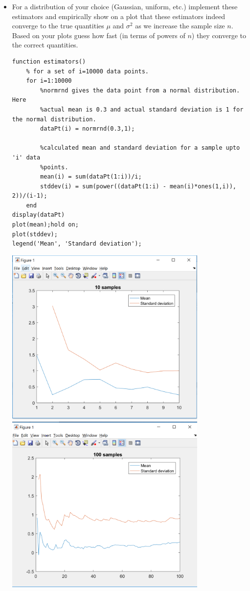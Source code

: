 \documentclass{article}
\begin{document}
\begin{itemize}
\item For a distribution of your choice (Gaussian, uniform, etc.) implement these estimators and empirically show on a plot that these estimators indeed converge to the true quantities $\mu$ and $\sigma^2$ as we increase the sample size $n$. Based on your plots guess how fast (in terms of powers of $n$) they converge to the correct quantities.\\
\begin{verbatim}
function estimators()
    % for a set of i=10000 data points.
    for i=1:10000
        %normrnd gives the data point from a normal distribution. Here
        %actual mean is 0.3 and actual standard deviation is 1 for the normal distribution.
        dataPt(i) = normrnd(0.3,1); 
        
        %calculated mean and standard deviation for a sample upto 'i' data
        %points.
        mean(i) = sum(dataPt(1:i))/i; 
        stddev(i) = sum(power((dataPt(1:i) - mean(i)*ones(1,i)), 2))/(i-1); 
    end
display(dataPt)
plot(mean);hold on;
plot(stddev);
legend('Mean', 'Standard deviation');
\end{verbatim}
\includegraphics[width=100mm,scale=0.3]{5_1}\\
\includegraphics[width=100mm,scale=0.3]{5_2}\\

\end{itemize}
\end{document}
